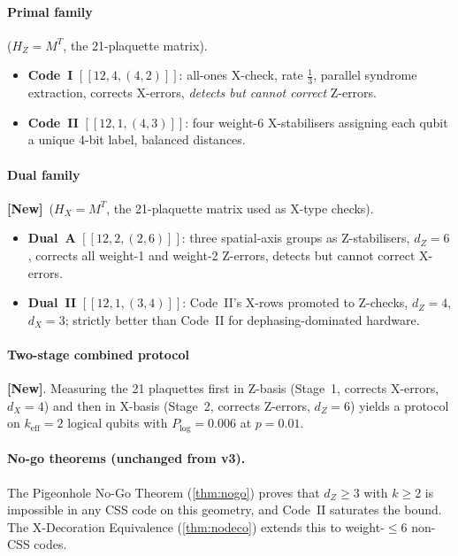 \documentclass[12pt,a4paper]{article}
\theoremstyle{plain}
\theoremstyle{definition}
\theoremstyle{remark}
\newcommand{\NEW}{\textcolor{newcolor}{\textbf{[New]}}}
\begin{document}
\paragraph{Primal family} ($H_Z = M^T$, the 21-plaquette matrix).
\begin{itemize}[noitemsep]
\item \textbf{Code~I} $[[12,4,(4,2)]]$: all-ones X-check, rate $\tfrac{1}{3}$,
  parallel syndrome extraction, corrects X-errors, \emph{detects but
  cannot correct} Z-errors.
\item \textbf{Code~II} $[[12,1,(4,3)]]$: four weight-6 X-stabilisers
  assigning each qubit a unique 4-bit label, balanced distances.
\end{itemize}

\paragraph{Dual family} \NEW\ ($H_X = M^T$, the 21-plaquette matrix
used as X-type checks).
\begin{itemize}[noitemsep]
\item \textbf{Dual~A} $[[12,2,(2,6)]]$: three spatial-axis groups as
  Z-stabilisers, $d_Z = 6$, corrects all weight-1 and weight-2
  Z-errors, detects but cannot correct X-errors.
\item \textbf{Dual~II} $[[12,1,(3,4)]]$: Code~II's X-rows promoted to
  Z-checks, $d_Z = 4$, $d_X = 3$; strictly better than Code~II for
  dephasing-dominated hardware.
\end{itemize}

\paragraph{Two-stage combined protocol} \NEW.
Measuring the 21 plaquettes first in Z-basis (Stage~1, corrects
X-errors, $d_X=4$) and then in X-basis (Stage~2, corrects Z-errors,
$d_Z=6$) yields a protocol on $k_{\mathrm{eff}}=2$ logical qubits
with $P_{\log}=0.006$ at $p=0.01$.

\paragraph{No-go theorems (unchanged from v3).}
The Pigeonhole No-Go Theorem (\cref{thm:nogo}) proves that
$d_Z\geq3$ with $k\geq2$ is impossible in any CSS code on this
geometry, and Code~II saturates the bound.
The X-Decoration Equivalence (\cref{thm:nodeco}) extends this to
weight-$\leq6$ non-CSS codes.
\end{document}
